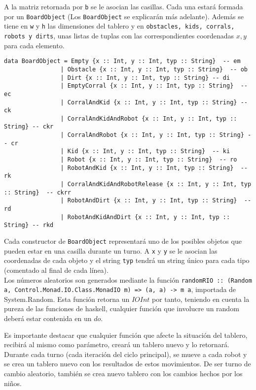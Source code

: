 \documentclass[a4paper,12pt]{article}
\def\code#1{\texttt{#1}}
\begin{document}
A la matriz retornada por \code{b} se le asocian las casillas. Cada una estará formada por un \code{BoardObject} (Los \code{BoardObject} se explicarán más adelante). Además se tiene en \code{w} y \code{h} las dimensiones del tablero y en \code{obstacles, kids, corrals, robots y dirts}, unas listas de tuplas con las correspondientes coordenadas $x,y$ para cada elemento.

\begin{lstlisting}
data BoardObject = Empty {x :: Int, y :: Int, typ :: String}  -- em
                | Obstacle {x :: Int, y :: Int, typ :: String}  -- ob
                | Dirt {x :: Int, y :: Int, typ :: String} -- di
                | EmptyCorral {x :: Int, y :: Int, typ :: String}  -- ec
                | CorralAndKid {x :: Int, y :: Int, typ :: String} -- ck
                | CorralAndKidAndRobot {x :: Int, y :: Int, typ :: String} -- ckr
                | CorralAndRobot {x :: Int, y :: Int, typ :: String} -- cr
                | Kid {x :: Int, y :: Int, typ :: String}  -- ki
                | Robot {x :: Int, y :: Int, typ :: String}  -- ro
                | RobotAndKid {x :: Int, y :: Int, typ :: String}  -- rk     
                | CorralAndKidAndRobotRelease {x :: Int, y :: Int, typ :: String}  -- ckrr
                | RobotAndDirt {x :: Int, y :: Int, typ :: String}  -- rd
                | RobotAndKidAndDirt {x :: Int, y :: Int, typ :: String} -- rkd
\end{lstlisting}

Cada constructor de \code{BoardObject} representará uno de los posibles objetos que pueden estar en una casilla durante un turno. A \code{x} y \code{y} se le asocian las coordenadas de cada objeto y el string \code{typ} tendrá un string único para cada tipo (comentado al final de cada línea).\\

Los números aleatorios son generados mediante la función \code{randomRIO :: (Random a, Control.Monad.IO.Class.MonadIO m) => (a, a) -> m a}, importada de System.Random. Esta función retorna un $IO Int$ por tanto, teniendo en cuenta la pureza de las funciones de haskell, cualquier función que involucre un random deberá estar contenida en un $do$.

Es importante destacar que cualquier función que afecte la situación del tablero, recibirá al mismo como parámetro, creará un tablero nuevo y lo retornará. Durante cada turno (cada iteración del ciclo principal), se mueve a cada robot y se crea un tablero nuevo con los resultados de estos movimientos. De ser turno de cambio aleatorio, también se crea nuevo tablero con los cambios hechos por los niños.\\
\end{document}
